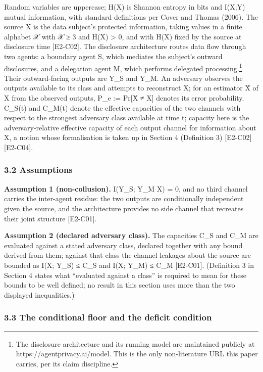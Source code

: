 \documentclass[
  11pt,
]{article}
\begin{document}
Random variables are uppercase; H(X) is Shannon entropy in bits and
I(X;Y) mutual information, with standard definitions per Cover and
Thomas (2006). The source X is the data subject's protected information,
taking values in a finite alphabet 𝒳 with \textbar 𝒳\textbar{} ≥ 3 and
H(X) \textgreater{} 0, and with H(X) fixed by the source at disclosure
time {[}E2-C02{]}. The disclosure architecture routes data flow through
two agents: a boundary agent S, which mediates the subject's outward
disclosures, and a delegation agent M, which performs delegated
processing.\footnote{The disclosure architecture and its running model
  are maintained publicly at https://agentprivacy.ai/model. This is the
  only non-literature URL this paper carries, per its claim discipline.}
Their outward-facing outputs are Y\_S and Y\_M. An adversary observes
the outputs available to its class and attempts to reconstruct X; for an
estimator X̂ of X from the observed outputs, P\_e := Pr{[}X̂ ≠ X{]}
denotes its error probability. C\_S(t) and C\_M(t) denote the effective
capacities of the two channels with respect to the strongest adversary
class available at time t; capacity here is the adversary-relative
effective capacity of each output channel for information about X, a
notion whose formalisation is taken up in Section 4 (Definition 3)
{[}E2-C02{]}{[}E2-C04{]}.

\subsubsection{3.2 Assumptions}\label{assumptions}

\textbf{Assumption 1 (non-collusion).} I(Y\_S; Y\_M \textbar{} X) = 0,
and no third channel carries the inter-agent residue: the two outputs
are conditionally independent given the source, and the architecture
provides no side channel that recreates their joint structure
{[}E2-C01{]}.

\textbf{Assumption 2 (declared adversary class).} The capacities C\_S
and C\_M are evaluated against a stated adversary class, declared
together with any bound derived from them; against that class the
channel leakages about the source are bounded as I(X; Y\_S) ≤ C\_S and
I(X; Y\_M) ≤ C\_M {[}E2-C01{]}. (Definition 3 in Section 4 states what
``evaluated against a class'' is required to mean for these bounds to be
well defined; no result in this section uses more than the two displayed
inequalities.)

\subsubsection{3.3 The conditional floor and the deficit
condition}\label{the-conditional-floor-and-the-deficit-condition}
\end{document}
